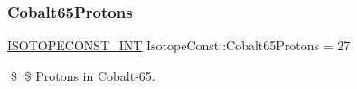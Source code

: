 \subsubsection{\texorpdfstring{Cobalt65\+Protons}{Cobalt65Protons}}
{\footnotesize\ttfamily \mbox{\hyperlink{group___isotope_const-_macros_ga5f18360b3e99483a35c32d789e62621c}{I\+S\+O\+T\+O\+P\+E\+C\+O\+N\+S\+T\+\_\+\+I\+NT}} Isotope\+Const\+::\+Cobalt65\+Protons = 27}

\$ \$ Protons in Cobalt-\/65. 